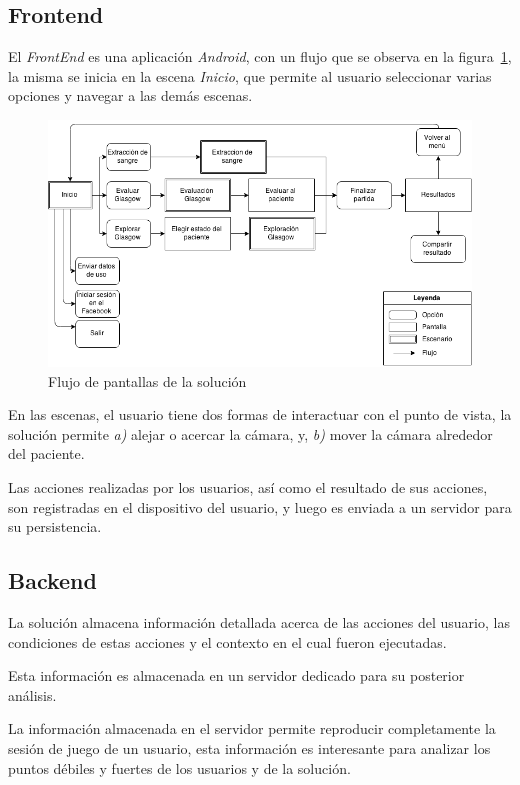 \subsection{Frontend}

El \textit{FrontEnd} es una aplicación \textit{Android}, con un flujo que se observa en la
figura~\ref{fig:flujo_frontend}, la misma se inicia en la escena \emph{Inicio},
que permite al usuario seleccionar varias opciones y navegar a las demás
escenas.

\begin{figure}[H]
\centering
\includegraphics[scale=0.29]{../solucion/images/grafo_escenas.png}
\caption{Flujo de pantallas de la solución}
\label{fig:flujo_frontend}
\end{figure}

En las escenas, el usuario tiene dos formas de interactuar con el punto de
vista, la solución permite \textit{a)} alejar o acercar la cámara, y,
\textit{b)} mover la cámara alrededor del paciente.

Las acciones realizadas por los usuarios, así como el resultado de sus acciones,
son registradas en el dispositivo del usuario, y luego es enviada a un servidor
para su persistencia.

\subsection{Backend}

La solución almacena información detallada acerca de las acciones del usuario,
las condiciones de estas acciones y el contexto en el cual fueron ejecutadas.

Esta información es almacenada en un servidor dedicado para su posterior
análisis.

La información almacenada en el servidor permite reproducir completamente la
sesión de juego de un usuario, esta información es interesante para analizar los
puntos débiles y fuertes de los usuarios y de la solución.

